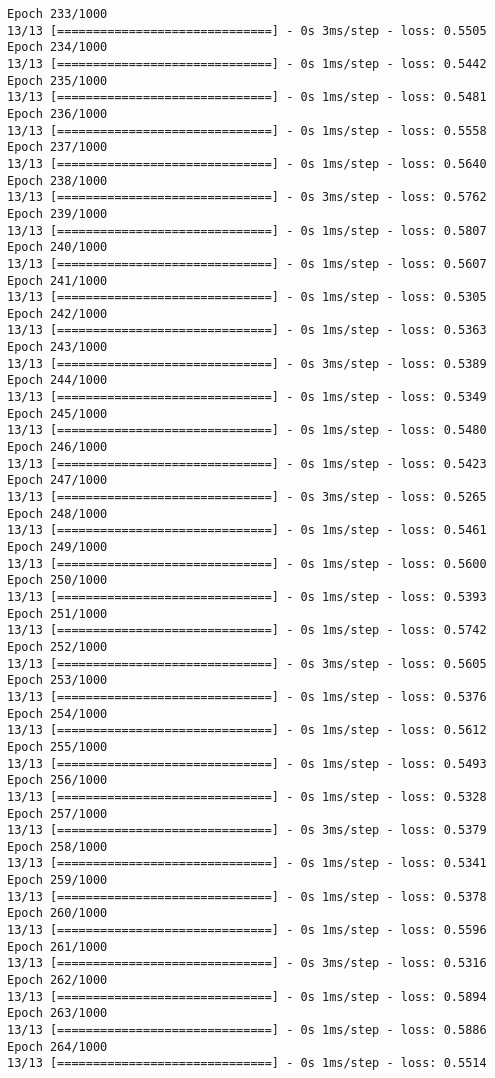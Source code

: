 \documentclass[11pt]{article}
\begin{document}
\begin{Verbatim}[commandchars=\\\{\}]
Epoch 233/1000
13/13 [==============================] - 0s 3ms/step - loss: 0.5505
Epoch 234/1000
13/13 [==============================] - 0s 1ms/step - loss: 0.5442
Epoch 235/1000
13/13 [==============================] - 0s 1ms/step - loss: 0.5481
Epoch 236/1000
13/13 [==============================] - 0s 1ms/step - loss: 0.5558
Epoch 237/1000
13/13 [==============================] - 0s 1ms/step - loss: 0.5640
Epoch 238/1000
13/13 [==============================] - 0s 3ms/step - loss: 0.5762
Epoch 239/1000
13/13 [==============================] - 0s 1ms/step - loss: 0.5807
Epoch 240/1000
13/13 [==============================] - 0s 1ms/step - loss: 0.5607
Epoch 241/1000
13/13 [==============================] - 0s 1ms/step - loss: 0.5305
Epoch 242/1000
13/13 [==============================] - 0s 1ms/step - loss: 0.5363
Epoch 243/1000
13/13 [==============================] - 0s 3ms/step - loss: 0.5389
Epoch 244/1000
13/13 [==============================] - 0s 1ms/step - loss: 0.5349
Epoch 245/1000
13/13 [==============================] - 0s 1ms/step - loss: 0.5480
Epoch 246/1000
13/13 [==============================] - 0s 1ms/step - loss: 0.5423
Epoch 247/1000
13/13 [==============================] - 0s 3ms/step - loss: 0.5265
Epoch 248/1000
13/13 [==============================] - 0s 1ms/step - loss: 0.5461
Epoch 249/1000
13/13 [==============================] - 0s 1ms/step - loss: 0.5600
Epoch 250/1000
13/13 [==============================] - 0s 1ms/step - loss: 0.5393
Epoch 251/1000
13/13 [==============================] - 0s 1ms/step - loss: 0.5742
Epoch 252/1000
13/13 [==============================] - 0s 3ms/step - loss: 0.5605
Epoch 253/1000
13/13 [==============================] - 0s 1ms/step - loss: 0.5376
Epoch 254/1000
13/13 [==============================] - 0s 1ms/step - loss: 0.5612
Epoch 255/1000
13/13 [==============================] - 0s 1ms/step - loss: 0.5493
Epoch 256/1000
13/13 [==============================] - 0s 1ms/step - loss: 0.5328
Epoch 257/1000
13/13 [==============================] - 0s 3ms/step - loss: 0.5379
Epoch 258/1000
13/13 [==============================] - 0s 1ms/step - loss: 0.5341
Epoch 259/1000
13/13 [==============================] - 0s 1ms/step - loss: 0.5378
Epoch 260/1000
13/13 [==============================] - 0s 1ms/step - loss: 0.5596
Epoch 261/1000
13/13 [==============================] - 0s 3ms/step - loss: 0.5316
Epoch 262/1000
13/13 [==============================] - 0s 1ms/step - loss: 0.5894
Epoch 263/1000
13/13 [==============================] - 0s 1ms/step - loss: 0.5886
Epoch 264/1000
13/13 [==============================] - 0s 1ms/step - loss: 0.5514

\end{Verbatim}
\end{document}
